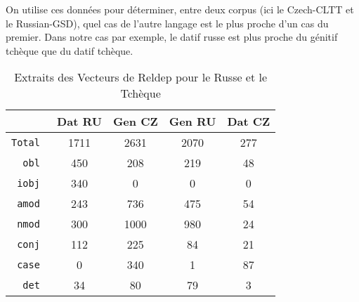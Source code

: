 \documentclass{article}
\begin{document}
\renewcommand{\arraystretch}{1.1}
\begin{table}[h]
        \centering
        \caption{Proximities for Case=Acc}
\end{table}

On utilise ces données pour déterminer, entre deux corpus (ici le Czech-CLTT et le Russian-GSD), quel cas de l'autre langage est le plus proche d'un cas du premier.
Dans notre cas par exemple, le datif russe est plus proche du génitif tchèque que du datif tchèque.

\begin{table}[h]
        \centering
        \begin{tabular}{>{\tt}r|cccc}
                \toprule
                &Dat RU & Gen CZ & Gen RU & Dat CZ\\
                \midrule
                Total & 1711 & 2631 & 2070 & 277\\
                obl & 450 & 208 & 219 & 48\\
                iobj & 340 & 0 & 0 & 0\\
                amod & 243 & 736 & 475 & 54\\
                nmod & 300 & 1000 & 980 & 24\\
                conj & 112 & 225 & 84 & 21\\
                case & 0 & 340 & 1 & 87\\
                det & 34 & 80 & 79 & 3\\
                \bottomrule
        \end{tabular}
        \caption{Extraits des Vecteurs de Reldep pour le Russe et le Tchèque}
\end{table}
\end{document}
